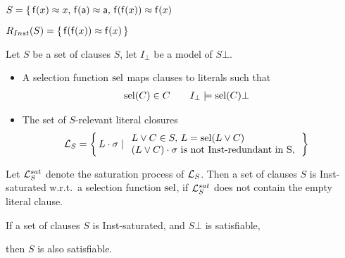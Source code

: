 \begin{example}
   \( S =
       \{ \,
       \mathsf{f}(x)\approx x,\,
       \mathsf{f}(\mathsf{a})\approx \mathsf{a},\,
       \mathsf{f}(\mathsf{f}(x))\approx\mathsf{f}(x)
       \,  \)

   \( R_{Inst}(S) = \{ \, \mathsf{f}(\mathsf{f}(x))\approx\mathsf{f}(x) \, \} \)
   \end{example}

   \begin{definition}[S-Relevance]
        Let \( S \) be a set of clauses \( S \), let \( I_\bot \) be a model of \( S\bot \).

       \begin{itemize}
           \item
        A selection function \( \operatorname{sel} \) maps clauses to literals such that
       \begin{align*}
           \operatorname{sel}(C)&\in C
            &&&
            I_\bot&\models\operatorname{sel}(C)\bot
       \end{align*}

       \item
        The set of \( S \)-relevant literal closures
       \begin{align*}
           \mathcal{L}_S &= \left \{ \, L\cdot\sigma \mid
           \begin{array}{l}
                L\lor C\in S,\,L = \operatorname{sel}(L\lor C)\\
                (L\lor C)\cdot\sigma\text{ is not Inst-redundant in S},\\
           \end{array}
           \, \right \}
       \end{align*}




   \end{itemize}
\end{definition}

\begin{definition}
    Let \( \mathcal{L}_S^{sat} \) denote the saturation process of \( \mathcal{L}_S \).
    Then a set of clauses \( S \) is Inst-saturated w.r.t.~a selection function \( \operatorname{sel} \),
            if \( \mathcal{L}_S^{sat} \) does not contain the empty literal clause.
\end{definition}

       \begin{theorem}\label{theorem:inst:saturated:satisfiable}
        If a set of clauses \( S \) is Inst-saturated,
        and \( S\bot \) is satisfiable,

        then \( S \) is also satisfiable.
       \end{theorem}

